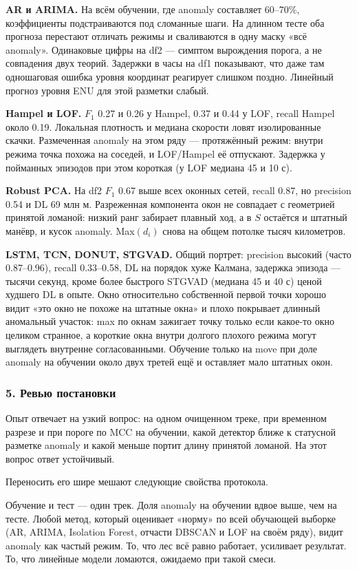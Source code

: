 \documentclass[a4paper,12pt]{report}
\begin{document}
\textbf{AR и ARIMA.} На всём обучении, где anomaly составляет 60–70\%, коэффициенты подстраиваются под сломанные шаги. На длинном тесте оба прогноза перестают отличать режимы и сваливаются в одну маску «всё anomaly». Одинаковые цифры на df2 — симптом вырождения порога, а не совпадения двух теорий. Задержки в часы на df1 показывают, что даже там одношаговая ошибка уровня координат реагирует слишком поздно. Линейный прогноз уровня ENU для этой разметки слабый.

\textbf{Hampel и LOF.} $F_1$ 0.27 и 0.26 у Hampel, 0.37 и 0.44 у LOF, recall Hampel около 0.19. Локальная плотность и медиана скорости ловят изолированные скачки. Размеченная anomaly на этом ряду — протяжённый режим: внутри режима точка похожа на соседей, и LOF/Hampel её отпускают. Задержка у пойманных эпизодов при этом короткая (у LOF медиана 45 и 10 с).

\textbf{Robust PCA.} На df2 $F_1$ 0.67 выше всех оконных сетей, recall 0.87, но precision 0.54 и DL 69 млн м. Разреженная компонента окон не совпадает с геометрией принятой ломаной: низкий ранг забирает плавный ход, а в $S$ остаётся и штатный манёвр, и кусок anomaly. Max$(d_i)$ снова на общем потолке тысяч километров.

\textbf{LSTM, TCN, DONUT, STGVAD.} Общий портрет: precision высокий (часто 0.87–0.96), recall 0.33–0.58, DL на порядок хуже Калмана, задержка эпизода — тысячи секунд, кроме более быстрого STGVAD (медиана 45 и 40 с) ценой худшего DL в опыте. Окно относительно собственной первой точки хорошо видит «это окно не похоже на штатные окна» и плохо покрывает длинный аномальный участок: max по окнам зажигает точку только если какое-то окно целиком странное, а короткие окна внутри долгого плохого режима могут выглядеть внутренне согласованными. Обучение только на move при доле anomaly на обучении около двух третей ещё и оставляет мало штатных окон.

\subsubsection{5. Ревью постановки}

Опыт отвечает на узкий вопрос: на одном очищенном треке, при временном разрезе и при пороге по MCC на обучении, какой детектор ближе к статусной разметке anomaly и какой меньше портит длину принятой ломаной. На этот вопрос ответ устойчивый.

Переносить его шире мешают следующие свойства протокола.

Обучение и тест — один трек. Доля anomaly на обучении вдвое выше, чем на тесте. Любой метод, который оценивает «норму» по всей обучающей выборке (AR, ARIMA, Isolation Forest, отчасти DBSCAN и LOF на своём ряду), видит anomaly как частый режим. То, что лес всё равно работает, усиливает результат. То, что линейные модели ломаются, ожидаемо при такой смеси.
\end{document}
